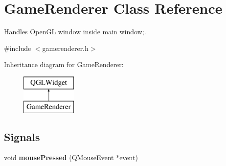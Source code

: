 \hypertarget{class_game_renderer}{\section{Game\-Renderer Class Reference}
\label{class_game_renderer}
}


Handles Open\-G\-L window inside main window;.  




{\ttfamily \#include $<$gamerenderer.\-h$>$}

Inheritance diagram for Game\-Renderer\-:\begin{figure}[H]
\begin{center}
\leavevmode
\includegraphics[height=2.000000cm]{class_game_renderer}
\end{center}
\end{figure}
\subsection*{Signals}
\begin{DoxyCompactItemize}
\item 
\hypertarget{class_game_renderer_aff73192b784fa17d2b11c28aa1635f20}{void {\bfseries mouse\-Pressed} (Q\-Mouse\-Event $\ast$event)}\label{class_game_renderer_aff73192b784fa17d2b11c28aa1635f20}

\end{DoxyCompactItemize}
